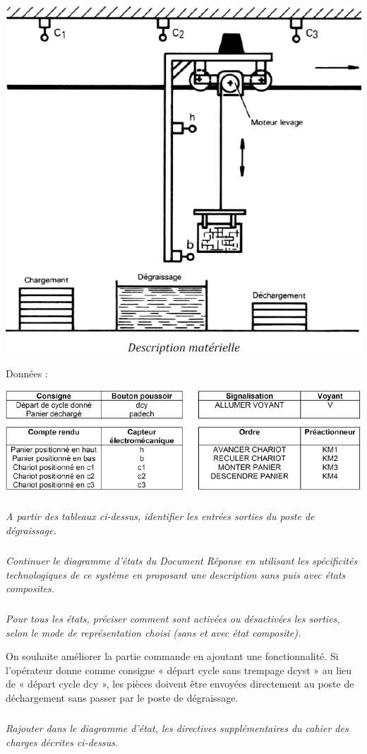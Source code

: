 \documentclass[10pt]{article}
\begin{document}
\begin{center}
\includegraphics[width=.5\textwidth]{images/fig_03}
\end{center}

Données : 

\begin{center}
\includegraphics[width=.5\textwidth]{images/fig_04}
\end{center}


\subparagraph{}
\textit{A partir des tableaux ci-dessus, identifier les entrées sorties du poste de dégraissage.}

\subparagraph{}
\textit{Continuer le diagramme d’états du Document Réponse en utilisant les spécificités
technologiques de ce système en proposant une description sans puis avec états
composites.}

\subparagraph{}
\textit{Pour tous les états, préciser comment sont activées ou désactivées les sorties, selon le
mode de représentation choisi (sans et avec état composite).}


On souhaite améliorer la partie commande en ajoutant une fonctionnalité. Si l’opérateur donne
comme consigne « départ cycle sans trempage dcyst » au lieu de « départ cycle dcy », les pièces
doivent être envoyées directement au poste de déchargement sans passer par le poste de
dégraissage.

\subparagraph{}
\textit{Rajouter dans le diagramme d’état, les directives supplémentaires du cahier des charges
décrites ci-dessus.}
\end{document}
